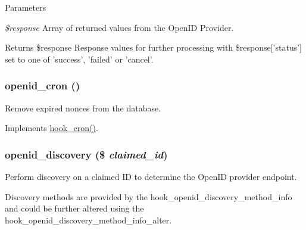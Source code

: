 \begin{DoxyParams}{Parameters}
\item[{\em \$response}]Array of returned values from the OpenID Provider.\end{DoxyParams}
\begin{DoxyReturn}{Returns}
\$response Response values for further processing with \$response\mbox{[}'status'\mbox{]} set to one of 'success', 'failed' or 'cancel'. 
\end{DoxyReturn}
\hypertarget{openid_8module_af88e0dcff253cebd08363501020daf76}{
\subsubsection[{openid\_\-cron}]{\setlength{\rightskip}{0pt plus 5cm}openid\_\-cron ()}}
\label{openid_8module_af88e0dcff253cebd08363501020daf76}
Remove expired nonces from the database.

Implements \hyperlink{group__hooks_gaf07f1e3d98112fc2ba6920cf7ee6fb16}{hook\_\-cron()}. \hypertarget{openid_8module_ae52417e5179c251a3256583ea3e67d30}{
\subsubsection[{openid\_\-discovery}]{\setlength{\rightskip}{0pt plus 5cm}openid\_\-discovery (\$ {\em claimed\_\-id})}}
\label{openid_8module_ae52417e5179c251a3256583ea3e67d30}
Perform discovery on a claimed ID to determine the OpenID provider endpoint.

Discovery methods are provided by the hook\_\-openid\_\-discovery\_\-method\_\-info and could be further altered using the hook\_\-openid\_\-discovery\_\-method\_\-info\_\-alter.


